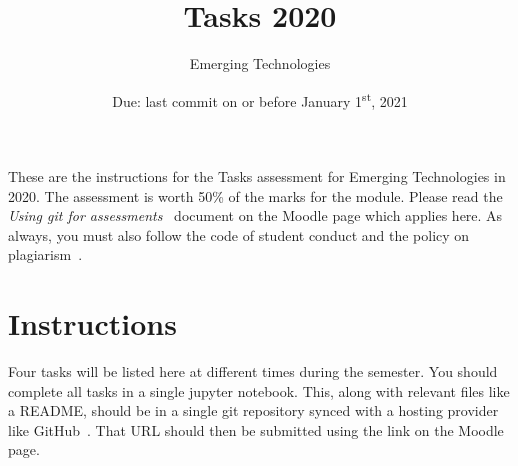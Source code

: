 \documentclass[a4paper, 12pt]{scrartcl}
\title{\vspace{-20mm}Tasks 2020}
\author{Emerging Technologies}
\date{Due: last commit on or before January 1\textsuperscript{st}, 2021\vspace{-6mm}}
\begin{document}
  
  \maketitle

  These are the instructions for the Tasks assessment for Emerging Technologies in 2020.
  The assessment is worth 50\% of the marks for the module.
  Please read the \emph{Using git for assessments}~\cite{usinggit} document on the Moodle page which applies here.
  As always, you must also follow the code of student conduct and the policy on plagiarism~\cite{gmitqaf}.

  \section*{Instructions}
    Four tasks will be listed here at different times during the semester.
    You should complete all tasks in a single jupyter notebook.
    This, along with relevant files like a README, should be in a single git repository synced with a hosting provider like GitHub~\cite{github}.
    That URL should then be submitted using the link on the Moodle page.
\end{document}
